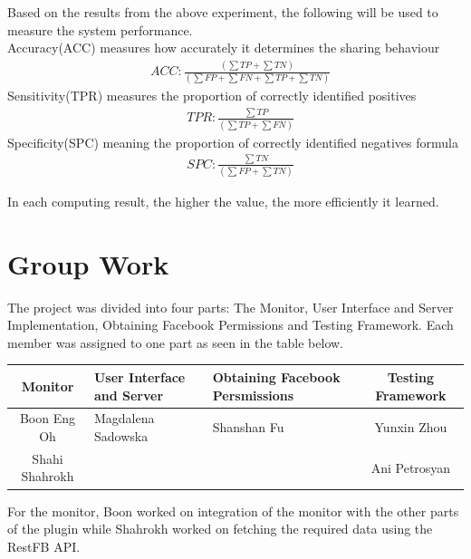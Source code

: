 \documentclass[a4paper,11pt]{article}
\begin{document}
Based on the results from the above experiment, the following will be used to measure the system performance.
\\Accuracy(ACC) measures how accurately it determines the sharing behaviour
\begin{align}
 &ACC: \frac{(\sum{TP} + \sum{TN})}{(\sum{FP} + \sum{FN} + \sum{TP} + \sum{TN})}
\end{align}
Sensitivity(TPR) measures the proportion of correctly identified positives
\begin{align}
 &TPR: \frac{\sum{TP}}{(\sum{TP} + \sum{FN})}
\end{align}
Specificity(SPC) meaning the proportion of correctly identified negatives formula 
\begin{align}
&SPC: \frac{\sum{TN}}{(\sum{FP} + \sum{TN})}
\end{align}

 \noindent In each computing result, the higher the value, the more efficiently it learned.

\section{Group Work}

The project was divided into four parts: The Monitor, User Interface and Server Implementation, Obtaining Facebook Permissions and Testing Framework. Each member was assigned to one part as seen in the table below.

 \begin{table}[H]
\centering
{} \label{tab:title2}
\hspace*{-0.3in}
 \begin{tabular}{|c|M{4cm}|M{4cm}|c|}
 \hline
\textbf{Monitor} & \textbf{User Interface and Server} & \textbf{Obtaining Facebook Persmissions} & \textbf{Testing Framework}\\

\hline
Boon Eng Oh & Magdalena Sadowska & Shanshan Fu & Yunxin Zhou \\


Shahi Shahrokh & & & Ani Petrosyan \\
\hline
 \end{tabular}
 \end{table}

For the monitor, Boon worked on integration of the monitor with the other parts of the plugin while Shahrokh worked on fetching the required data using the RestFB API.\\
\indent 
\end{document}
